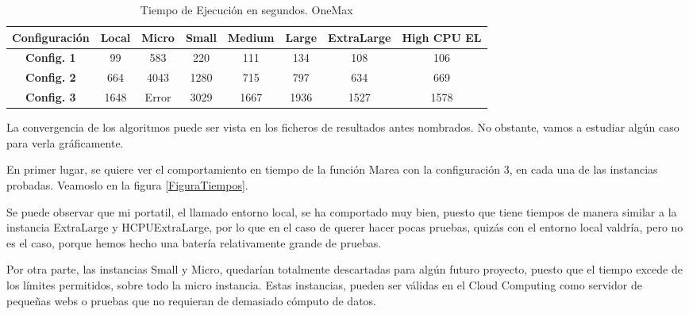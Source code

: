 \documentclass[runningheads]{llncs}
\begin{document}
\begin{table}[htb]
\begin{tabular}{|| c | c | c | c | c |c | c | c ||}
    \hline
    \textbf{Configuración} & \textbf{Local} & \textbf{Micro} & \textbf{Small} & \textbf{Medium} &
    \textbf{Large} & \textbf{ExtraLarge} & \textbf{High CPU EL}  \\

    \hline
    \textbf{Config. 1} & 99 & 583 & 220 & 111 & 134 & 108 & 106 \\
    \hline
    \textbf{Config. 2} & 664 & 4043 & 1280 & 715 & 797 & 634 & 669 \\
    \hline
    \textbf{Config. 3} & 1648 & Error & 3029 & 1667 & 1936 & 1527 & 1578 \\
    \hline
  \end{tabular}
  \caption{Tiempo de Ejecución en segundos. OneMax} 
  \label{TablaParametrosOneMax}
\end{table}

La convergencia de los algoritmos puede ser vista en los ficheros de resultados antes nombrados. No obstante, vamos a estudiar 
algún caso para verla gráficamente. \newpage

En primer lugar, se quiere ver el comportamiento en tiempo de la función Marea con la configuración 3, en cada una de las instancias
probadas. Veamoslo en la figura \ref{FiguraTiempos}.


Se puede observar que mi portatil, el llamado entorno local, se ha comportado muy bien, puesto que tiene tiempos de manera similar a 
la instancia ExtraLarge y HCPUExtraLarge, por lo que en el caso de querer hacer pocas pruebas, quizás con el entorno local 
valdría, pero no es el caso, porque hemos hecho una batería relativamente grande de pruebas.  \vspace{12pt}

Por otra parte, las instancias 
Small y Micro, quedarían totalmente descartadas para algún futuro proyecto, puesto que el tiempo excede de los límites 
permitidos, sobre todo la micro instancia. Estas instancias, pueden ser válidas en el Cloud Computing como servidor de pequeñas 
webs o pruebas que no requieran de demasiado cómputo de datos. \vspace{12pt}
\end{document}

